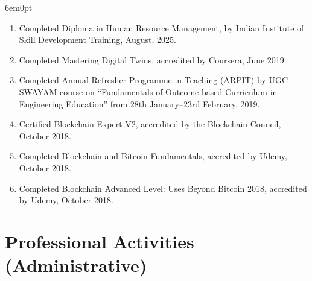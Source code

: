 \documentclass[11pt,a4paper]{moderncv}
\begin{document}
\begin{adjustwidth}{6em}{0pt}
	\begin{enumerate}
		
		\item Completed Diploma in Human Resource Management, by Indian Institute of Skill Development Training, August, 2025.
		
		\item Completed Mastering Digital Twins, accredited by Coursera, June 2019.
		
		\item Completed Annual Refresher Programme in Teaching (ARPIT) by UGC SWAYAM course on “Fundamentals of Outcome-based Curriculum in Engineering Education” from 28th January–23rd February, 2019.
		
		\item Certified Blockchain Expert-V2, accredited by the Blockchain Council, October 2018.
		
		\item Completed Blockchain and Bitcoin Fundamentals, accredited by Udemy, October 2018.
		
		\item Completed Blockchain Advanced Level: Uses Beyond Bitcoin 2018, accredited by Udemy, October 2018.
		
	\end{enumerate}
\end{adjustwidth}



\section{\textbf{Professional Activities (Administrative)}}
\end{document}
